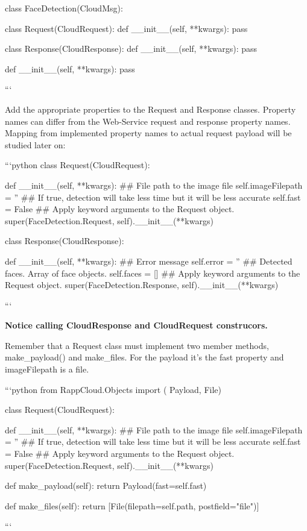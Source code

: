 class Face\-Detection(\-Cloud\-Msg)\-: \begin{DoxyVerb}class Request(CloudRequest):
    def __init__(self, **kwargs):
        pass


class Response(CloudResponse):
    def __init__(self, **kwargs):
        pass


def __init__(self, **kwargs):
    pass
\end{DoxyVerb}
 ```

Add the appropriate properties to the Request and Response classes. Property names can differ from the Web-\/\-Service request and response property names. Mapping from implemented property names to actual request payload will be studied later on\-:

```python class Request(\-Cloud\-Request)\-: \begin{DoxyVerb}def __init__(self, **kwargs):
    ## File path to the image file
    self.imageFilepath = ''
    ## If true, detection will take less time but it will be less accurate
    self.fast = False
    ## Apply keyword arguments to the Request object.
    super(FaceDetection.Request, self).__init__(**kwargs)
\end{DoxyVerb}


class Response(\-Cloud\-Response)\-: \begin{DoxyVerb}def __init__(self, **kwargs):
    ## Error message
    self.error = ''
    ## Detected faces. Array of face objects.
    self.faces = []
    ## Apply keyword arguments to the Request object.
    super(FaceDetection.Response, self).__init__(**kwargs)
\end{DoxyVerb}
 ```

{\bfseries Notice calling {\ttfamily Cloud\-Response} and {\ttfamily Cloud\-Request} construcors.}

Remember that a {\ttfamily Request} class must implement two member methods, {\ttfamily make\-\_\-payload()} and {\ttfamily make\-\_\-files}. For the payload it's the {\ttfamily fast} property and image\-Filepath is a file.

```python from Rapp\-Cloud.\-Objects import ( Payload, File)

class Request(\-Cloud\-Request)\-: \begin{DoxyVerb}def __init__(self, **kwargs):
    ## File path to the image file
    self.imageFilepath = ''
    ## If true, detection will take less time but it will be less accurate
    self.fast = False
    ## Apply keyword arguments to the Request object.
    super(FaceDetection.Request, self).__init__(**kwargs)

def make_payload(self):
    return Payload(fast=self.fast)

def make_files(self):
    return [File(filepath=self.path, postfield="file")]
\end{DoxyVerb}
 ```

